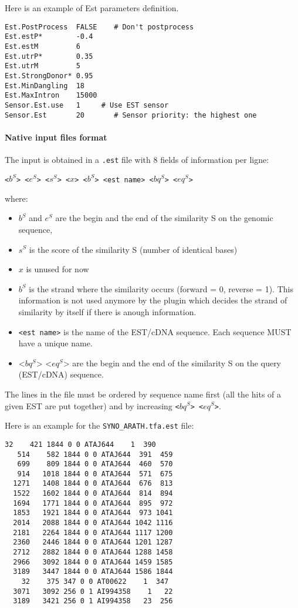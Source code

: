 Here is an example of Est parameters definition.
\begin{Verbatim}[fontsize=\small]
Est.PostProcess  FALSE    # Don't postprocess
Est.estP*        -0.4
Est.estM         6
Est.utrP*        0.35
Est.utrM         5
Est.StrongDonor* 0.95
Est.MinDangling  18
Est.MaxIntron    15000
Sensor.Est.use   1     # Use EST sensor
Sensor.Est       20       # Sensor priority: the highest one
\end{Verbatim}


\paragraph{Native input files format}

The input is obtained in a \texttt{.est} file with 8 fields of information
per ligne:

\texttt{<$b^S$> <$e^S$> <$s^S$> <$x$> <$b^S$> <est name> <$bq^S$> <$eq^S$>}

where:
\begin{itemize}
\item $b^S$ and $e^S$ are the begin and the end of the similarity S on the genomic sequence,
\item $s^S$ is the score of the similarity S (number of identical bases)
\item $x$ is unused for now
\item $b^S$ is the strand where the similarity occurs (forward = 0,
  reverse = 1). This information is not used anymore by the plugin
  which decides the strand of similarity by itself if there is anough
  information.
\item \texttt{<est name>} is the name of the EST/cDNA sequence. Each
  sequence MUST have a unique name.
\item <$bq^S$> <$eq^S$> are the begin and the end of the similarity S
  on the query (EST/cDNA) sequence.
\end{itemize}
The lines in the file must be ordered by sequence name first (all the
hits of a given EST are put together) and by increasing
\texttt{<$bq^S$> <$eq^S$>}. 

Here is an example for the \texttt{SYNO\_ARATH.tfa.est} file:
\begin{Verbatim}[fontsize=\small]
    32    421 1844 0 0 ATAJ644    1  390
   514    582 1844 0 0 ATAJ644  391  459
   699    809 1844 0 0 ATAJ644  460  570
   914   1018 1844 0 0 ATAJ644  571  675
  1271   1408 1844 0 0 ATAJ644  676  813
  1522   1602 1844 0 0 ATAJ644  814  894
  1694   1771 1844 0 0 ATAJ644  895  972
  1853   1921 1844 0 0 ATAJ644  973 1041
  2014   2088 1844 0 0 ATAJ644 1042 1116
  2181   2264 1844 0 0 ATAJ644 1117 1200
  2360   2446 1844 0 0 ATAJ644 1201 1287
  2712   2882 1844 0 0 ATAJ644 1288 1458
  2966   3092 1844 0 0 ATAJ644 1459 1585
  3189   3447 1844 0 0 ATAJ644 1586 1844
    32    375 347 0 0 AT00622    1  347
  3071   3092 256 0 1 AI994358    1   22
  3189   3421 256 0 1 AI994358   23  256
\end{Verbatim}

